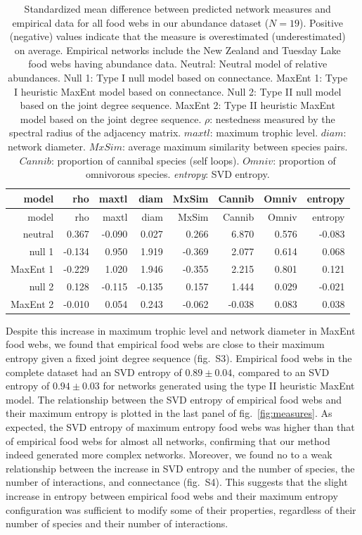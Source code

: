\documentclass[10pt,oneside]{article}
\begin{document}
\hypertarget{tbl:measures_abund}{}
\begin{longtable}[]{@{}rrrrrrrr@{}}
\caption{\label{tbl:measures_abund}Standardized mean difference between
predicted network measures and empirical data for all food webs in our
abundance dataset (\(N = 19\)). Positive (negative) values indicate that
the measure is overestimated (underestimated) on average. Empirical
networks include the New Zealand and Tuesday Lake food webs having
abundance data. Neutral: Neutral model of relative abundances. Null 1:
Type I null model based on connectance. MaxEnt 1: Type I heuristic
MaxEnt model based on connectance. Null 2: Type II null model based on
the joint degree sequence. MaxEnt 2: Type II heuristic MaxEnt model
based on the joint degree sequence. \(\rho\): nestedness measured by the
spectral radius of the adjacency matrix. \(maxtl\): maximum trophic
level. \(diam\): network diameter. \(MxSim\): average maximum similarity
between species pairs. \(Cannib\): proportion of cannibal species (self
loops). \(Omniv\): proportion of omnivorous species. \emph{entropy}: SVD
entropy.}\tabularnewline
\toprule
model & rho & maxtl & diam & MxSim & Cannib & Omniv &
entropy\tabularnewline
\midrule
\endfirsthead
\toprule
model & rho & maxtl & diam & MxSim & Cannib & Omniv &
entropy\tabularnewline
\midrule
\endhead
neutral & 0.367 & -0.090 & 0.027 & 0.266 & 6.870 & 0.576 &
-0.083\tabularnewline
null 1 & -0.134 & 0.950 & 1.919 & -0.369 & 2.077 & 0.614 &
0.068\tabularnewline
MaxEnt 1 & -0.229 & 1.020 & 1.946 & -0.355 & 2.215 & 0.801 &
0.121\tabularnewline
null 2 & 0.128 & -0.115 & -0.135 & 0.157 & 1.444 & 0.029 &
-0.021\tabularnewline
MaxEnt 2 & -0.010 & 0.054 & 0.243 & -0.062 & -0.038 & 0.083 &
0.038\tabularnewline
\bottomrule
\end{longtable}

Despite this increase in maximum trophic level and network diameter in
MaxEnt food webs, we found that empirical food webs are close to their
maximum entropy given a fixed joint degree sequence (fig.~S3). Empirical
food webs in the complete dataset had an SVD entropy of
\(0.89 \pm 0.04\), compared to an SVD entropy of \(0.94 \pm 0.03\) for
networks generated using the type II heuristic MaxEnt model. The
relationship between the SVD entropy of empirical food webs and their
maximum entropy is plotted in the last panel of fig.~\ref{fig:measures}.
As expected, the SVD entropy of maximum entropy food webs was higher
than that of empirical food webs for almost all networks, confirming
that our method indeed generated more complex networks. Moreover, we
found no to a weak relationship between the increase in SVD entropy and
the number of species, the number of interactions, and connectance
(fig.~S4). This suggests that the slight increase in entropy between
empirical food webs and their maximum entropy configuration was
sufficient to modify some of their properties, regardless of their
number of species and their number of interactions.
\end{document}
